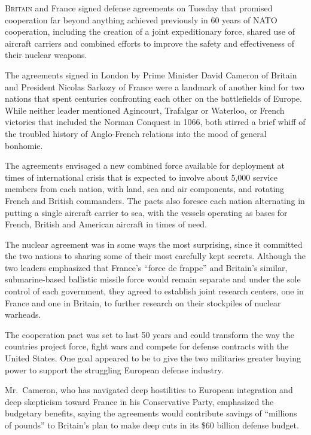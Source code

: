 ﻿\documentclass[12pt]{article}
\begin{document}
\lettrine{B}{ritain} and France signed defense agreements on Tuesday that
promised cooperation far beyond anything achieved previously in 60 years of NATO cooperation,
including the creation of a joint expeditionary force, shared use of aircraft carriers and combined
efforts to improve the safety and effectiveness of their nuclear weapons.

The agreements signed in London by Prime Minister David Cameron of Britain and President Nicolas
Sarkozy of France were a landmark of another kind for two nations that spent centuries confronting
each other on the battlefields of Europe. While neither leader mentioned Agincourt, Trafalgar or
Waterloo, or French victories that included the Norman Conquest in 1066, both stirred a brief whiff
of the troubled history of Anglo-French relations into the mood of general bonhomie.

The agreements envisaged a new combined force available for deployment at times of international
crisis that is expected to involve about 5,000 service members from each nation, with land, sea and
air components, and rotating French and British commanders. The pacts also foresee each nation
alternating in putting a single aircraft carrier to sea, with the vessels operating as bases for
French, British and American aircraft in times of need.

The nuclear agreement was in some ways the most surprising, since it committed the two nations to
sharing some of their most carefully kept secrets. Although the two leaders emphasized that France's
``force de frappe'' and Britain's similar, submarine-based ballistic missile force would remain
separate and under the sole control of each government, they agreed to establish joint research
centers, one in France and one in Britain, to further research on their stockpiles of nuclear
warheads.

The cooperation pact was set to last 50 years and could transform the way the countries project
force, fight wars and compete for defense contracts with the United States. One goal appeared to be
to give the two militaries greater buying power to support the struggling European defense industry.

Mr.~Cameron, who has navigated deep hostilities to European integration and deep skepticism toward
France in his Conservative Party, emphasized the budgetary benefits, saying the agreements would
contribute savings of ``millions of pounds'' to Britain's plan to make deep cuts in its \$60 billion
defense budget.
\end{document}

